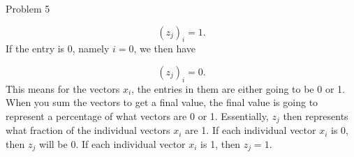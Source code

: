 \begin{problem}{Problem 5}
\begin{Highlight}
        \begin{equation}
            (z_{j})_{i} = 1.
        \end{equation}
        If the entry is 0, namely $i = 0$, we then have

        \begin{equation}
            (z_{j})_{i} = 0.
        \end{equation}
        This means for the vectors $x_{i}$, the entries in them are either going to be 0 or 1. When you sum the vectors to get a final value, the final value is going to represent a percentage of what vectors
        are 0 or 1. Essentially, $z_{j}$ then represents what fraction of the individual vectors $x_{i}$ are 1. If each individual vector $x_{i}$ is 0, then $z_{j}$ will be 0. If each individual vector $x_{i}$
        is 1, then $z_{j} = 1$.
    \end{Highlight}
\end{problem}


